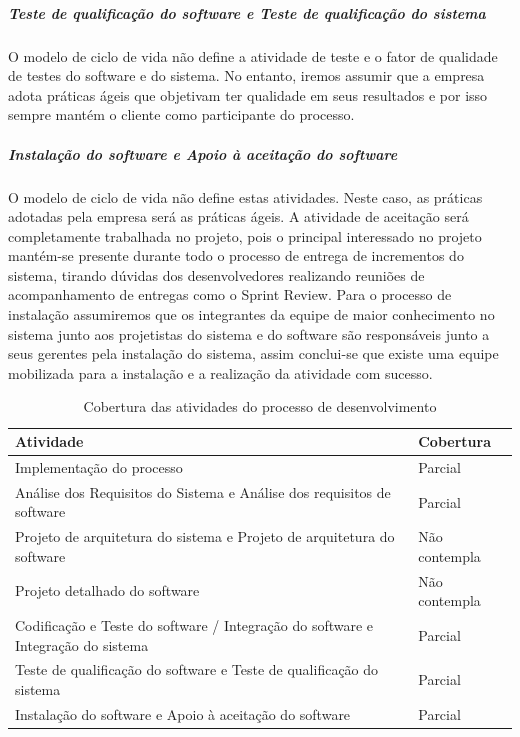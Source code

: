 \subparagraph{Teste de qualificação do software e Teste de qualificação do sistema }

O modelo de ciclo de vida não define a atividade de teste e o fator de qualidade de testes do software e do sistema. No entanto, iremos assumir que a empresa adota práticas ágeis que objetivam ter qualidade em seus resultados e por isso sempre mantém o cliente como participante do processo.

\subparagraph{Instalação do software e Apoio à aceitação do software}

O modelo de ciclo de vida não define estas atividades. Neste caso, as práticas adotadas pela empresa será as práticas ágeis. A atividade de aceitação será completamente trabalhada no projeto, pois o principal interessado no projeto mantém-se presente durante todo o processo de entrega de incrementos do sistema, tirando dúvidas dos desenvolvedores realizando reuniões de acompanhamento de entregas como o Sprint Review. Para o processo de instalação assumiremos que os integrantes da equipe de maior conhecimento no sistema junto aos projetistas do sistema e do software são responsáveis junto a seus gerentes pela instalação do sistema, assim conclui-se que existe uma equipe mobilizada para a instalação e a realização da atividade com sucesso.

\begin{table}[htb]
      \begin{center}
        \begin{tabular}{| p{6cm} | l |}
        \hline
        \textbf{Atividade} & \textbf{Cobertura} \\ \hline
        Implementação do processo & Parcial \\ \hline
        Análise dos Requisitos do Sistema e Análise dos requisitos de software & Parcial \\ \hline
        Projeto de arquitetura do sistema e Projeto de arquitetura do software & Não contempla \\ \hline
        Projeto detalhado do software & Não contempla \\ \hline
        Codificação e Teste do software / Integração do software e Integração do sistema & Parcial \\ \hline
        Teste de qualificação do software e Teste de qualificação do sistema & Parcial \\ \hline
        Instalação do software e Apoio à aceitação do software & Parcial \\ \hline
        \end{tabular}
      \end{center}
    \caption{Cobertura das atividades do processo de desenvolvimento}
    \end{table}


